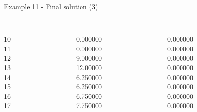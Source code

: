 \begin{frame}{Example 11 - Final solution (3)}
\footnotesize

\begin{columns}[t]
\begin{column}{0.3\textwidth}
\\
10\\
11\\
12\\
13\\
14\\
15\\
16\\
17\\

\end{column}
\begin{column}{0.3\textwidth}
\\
0.000000\\
0.000000\\
9.000000\\
12.00000\\
6.250000\\
6.250000\\
6.750000\\
7.750000\\

\end{column}

\begin{column}{0.3\textwidth}
\\
0.000000\\
0.000000\\
0.000000\\
0.000000\\
0.000000\\
0.000000\\
0.000000\\
0.000000\\
\end{column}
\end{columns}
\end{frame}


